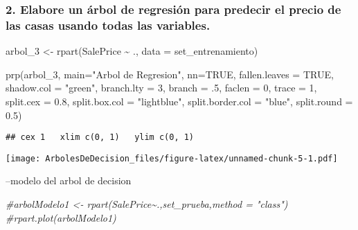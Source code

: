 \documentclass[
]{article}
\newenvironment{Shaded}{\begin{snugshade}}{\end{snugshade}}
\newcommand{\AttributeTok}[1]{\textcolor[rgb]{0.77,0.63,0.00}{#1}}
\newcommand{\CommentTok}[1]{\textcolor[rgb]{0.56,0.35,0.01}{\textit{#1}}}
\newcommand{\ConstantTok}[1]{\textcolor[rgb]{0.00,0.00,0.00}{#1}}
\newcommand{\DecValTok}[1]{\textcolor[rgb]{0.00,0.00,0.81}{#1}}
\newcommand{\FloatTok}[1]{\textcolor[rgb]{0.00,0.00,0.81}{#1}}
\newcommand{\FunctionTok}[1]{\textcolor[rgb]{0.00,0.00,0.00}{#1}}
\newcommand{\NormalTok}[1]{#1}
\newcommand{\OtherTok}[1]{\textcolor[rgb]{0.56,0.35,0.01}{#1}}
\newcommand{\SpecialCharTok}[1]{\textcolor[rgb]{0.00,0.00,0.00}{#1}}
\newcommand{\StringTok}[1]{\textcolor[rgb]{0.31,0.60,0.02}{#1}}
\begin{document}
\hypertarget{elabore-un-uxe1rbol-de-regresiuxf3n-para-predecir-el-precio-de-las-casas-usando-todas-las-variables.}{%
\subsubsection{2. Elabore un árbol de regresión para predecir el precio
de las casas usando todas las
variables.}\label{elabore-un-uxe1rbol-de-regresiuxf3n-para-predecir-el-precio-de-las-casas-usando-todas-las-variables.}}

\begin{Shaded}
\begin{Highlighting}[]
\NormalTok{arbol\_3 }\OtherTok{\textless{}{-}} \FunctionTok{rpart}\NormalTok{(SalePrice }\SpecialCharTok{\textasciitilde{}}\NormalTok{ ., }\AttributeTok{data =}\NormalTok{ set\_entrenamiento)}
\end{Highlighting}
\end{Shaded}

\begin{Shaded}
\begin{Highlighting}[]
\FunctionTok{prp}\NormalTok{(arbol\_3, }\AttributeTok{main=}\StringTok{"Arbol de Regresion"}\NormalTok{, }\AttributeTok{nn=}\ConstantTok{TRUE}\NormalTok{, }\AttributeTok{fallen.leaves =} \ConstantTok{TRUE}\NormalTok{, }\AttributeTok{shadow.col =} \StringTok{"green"}\NormalTok{, }\AttributeTok{branch.lty =} \DecValTok{3}\NormalTok{, }\AttributeTok{branch =}\NormalTok{ .}\DecValTok{5}\NormalTok{, }\AttributeTok{faclen =} \DecValTok{0}\NormalTok{, }\AttributeTok{trace =} \DecValTok{1}\NormalTok{, }\AttributeTok{split.cex =} \FloatTok{0.8}\NormalTok{, }\AttributeTok{split.box.col =} \StringTok{"lightblue"}\NormalTok{, }\AttributeTok{split.border.col =} \StringTok{"blue"}\NormalTok{, }\AttributeTok{split.round =} \FloatTok{0.5}\NormalTok{)}
\end{Highlighting}
\end{Shaded}

\begin{verbatim}
## cex 1   xlim c(0, 1)   ylim c(0, 1)
\end{verbatim}

\texttt{[image: ArbolesDeDecision\_files/figure-latex/unnamed-chunk-5-1.pdf]}

--modelo del arbol de decision

\begin{Shaded}
\begin{Highlighting}[]
\CommentTok{\#arbolModelo1 \textless{}{-} rpart(SalePrice\textasciitilde{}.,set\_prueba,method = "class")}
\CommentTok{\#rpart.plot(arbolModelo1)}
\end{Highlighting}
\end{Shaded}
\end{document}

